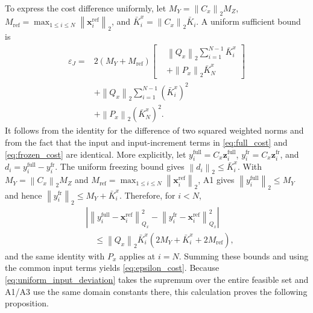 \documentclass[journal]{IEEEtran}
\newcommand{\vx}{\mathbf{x}}
\newcommand{\vz}{\mathbf{z}}
\newcommand{\norm}[1]{\left\lVert #1\right\rVert}
\begin{document}
To express the cost difference uniformly, let $M_Y=\norm{C_x}_2M_Z$, $M_{\mathrm{ref}}=\max_{1\le i\le N}\norm{\vx_i^{\mathrm{ref}}}_2$, and $\bar K_i^x=\norm{C_x}_2\bar K_i$. A uniform sufficient bound is
\begin{equation}
\begin{aligned}
\varepsilon_J={}&2(M_Y+M_{\mathrm{ref}})
 \left[\begin{aligned}
 &\norm{Q_x}_2\sum_{i=1}^{N-1}\bar K_i^x\\
 &+\norm{P_x}_2\bar K_N^x
 \end{aligned}\right]\\
&+\norm{Q_x}_2\sum_{i=1}^{N-1}(\bar K_i^x)^2\\
&+\norm{P_x}_2(\bar K_N^x)^2.
\end{aligned}
\label{eq:epsilon_cost}
\end{equation}
It follows from the identity for the difference of two squared weighted norms and from the fact that the input and input-increment terms in \eqref{eq:full_cost} and \eqref{eq:frozen_cost} are identical. More explicitly, let $y_i^{\mathrm{full}}=C_x\vz_i^{\mathrm{full}}$, $y_i^{\mathrm{fr}}=C_x\vz_i^{\mathrm{fr}}$, and $d_i=y_i^{\mathrm{full}}-y_i^{\mathrm{fr}}$. The uniform freezing bound gives $\norm{d_i}_2\le\bar K_i^x$. With $M_Y=\norm{C_x}_2M_Z$ and $M_{\mathrm{ref}}=\max_{1\le i\le N}\norm{\vx_i^{\mathrm{ref}}}_2$, A1 gives $\norm{y_i^{\mathrm{full}}}_2\le M_Y$ and hence $\norm{y_i^{\mathrm{fr}}}_2\le M_Y+\bar K_i^x$. Therefore, for $i<N$,
\begin{equation}
\begin{aligned}
&\left|\norm{y_i^{\mathrm{full}}-\vx_i^{\mathrm{ref}}}_{Q_x}^2-
\norm{y_i^{\mathrm{fr}}-\vx_i^{\mathrm{ref}}}_{Q_x}^2\right|\\
&\quad\le\norm{Q_x}_2\bar K_i^x(2M_Y+\bar K_i^x+2M_{\mathrm{ref}}),
\end{aligned}
\end{equation}
and the same identity with $P_x$ applies at $i=N$. Summing these bounds and using the common input terms yields \eqref{eq:epsilon_cost}. Because \eqref{eq:uniform_input_deviation} takes the supremum over the entire feasible set and A1/A3 use the same domain constants there, this calculation proves the following proposition.
\end{document}
